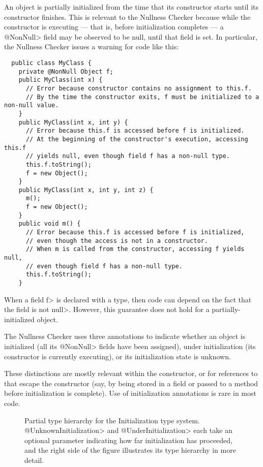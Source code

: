An object is partially initialized from the time that its constructor starts until its constructor
finishes.  This is relevant to the Nullness Checker because while the
constructor is executing --- that is, before initialization completes ---
a \<@NonNull>
field may be observed to be null, until that field is set.  In
particular, the Nullness Checker issues a warning for code like this:

\begin{Verbatim}
  public class MyClass {
    private @NonNull Object f;
    public MyClass(int x) {
      // Error because constructor contains no assignment to this.f.
      // By the time the constructor exits, f must be initialized to a non-null value.
    }
    public MyClass(int x, int y) {
      // Error because this.f is accessed before f is initialized.
      // At the beginning of the constructor's execution, accessing this.f
      // yields null, even though field f has a non-null type.
      this.f.toString();
      f = new Object();
    }
    public MyClass(int x, int y, int z) {
      m();
      f = new Object();
    }
    public void m() {
      // Error because this.f is accessed before f is initialized,
      // even though the access is not in a constructor.
      // When m is called from the constructor, accessing f yields null,
      // even though field f has a non-null type.
      this.f.toString();
    }
\end{Verbatim}

\noindent
When a field \<f> is declared with a 
type, then code can depend on the fact that the field is not \<null>.
However, this guarantee does not hold for a partially-initialized object.

The Nullness Checker uses three annotations to indicate whether an object
is initialized (all its \<@NonNull> fields have been assigned), under
initialization (its constructor is currently executing), or its
initialization state is unknown.

These distinctions are mostly relevant within the constructor, or for
references to  that escape the constructor (say, by being stored
in a field or passed to a method before initialization is complete).
Use of initialization annotations is rare in most code.



\begin{figure}
\caption{Partial type hierarchy for the Initialization type system.
  \<@UnknownInitialization> and \<@UnderInitialization> each take an
  optional parameter indicating how far initialization has proceeded, and
  the right side of the figure illustrates its type hierarchy in more detail.}
\label{fig-initialization-hierarchy}
\end{figure}

